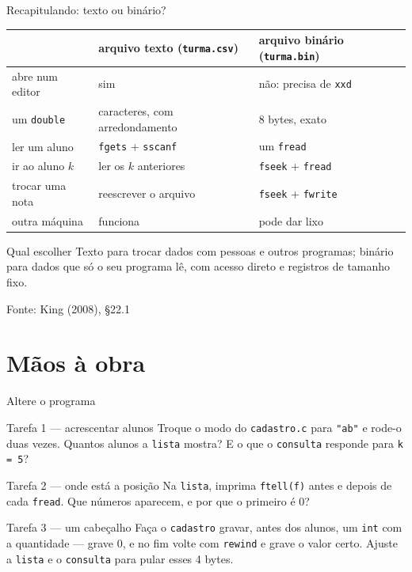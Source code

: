 \documentclass[aspectratio=169]{beamer}
\newcommand{\fonte}[1]{\vfill\hfill{\scriptsize\textcolor{UFSGray}{Fonte: #1}}}
\begin{document}
\begin{frame}{Recapitulando: texto ou binário?}
  \begin{center}
  \footnotesize
  \begin{tabular}{@{}lll@{}}
    \toprule
    & arquivo texto (\texttt{turma.csv}) & arquivo binário (\texttt{turma.bin})\\
    \midrule
    abre num editor          & sim                         & não: precisa de \texttt{xxd}\\
    um \texttt{double}       & caracteres, com arredondamento & 8 bytes, exato\\
    ler um aluno             & \texttt{fgets} + \texttt{sscanf} & um \texttt{fread}\\
    ir ao aluno $k$          & ler os $k$ anteriores       & \texttt{fseek} + \texttt{fread}\\
    trocar uma nota          & reescrever o arquivo        & \texttt{fseek} + \texttt{fwrite}\\
    outra máquina            & funciona                    & pode dar lixo\\
    \bottomrule
  \end{tabular}
  \end{center}
  \begin{block}{Qual escolher}
    \footnotesize Texto para trocar dados com pessoas e outros programas;
    binário para dados que só o seu programa lê, com acesso direto e
    registros de tamanho fixo.
  \end{block}
  \fonte{King (2008), §22.1~\cite{king2008c}}
\end{frame}

\section{Mãos à obra}

\begin{frame}{Altere o programa}
  \begin{block}{Tarefa 1 --- acrescentar alunos}
    \small Troque o modo do \texttt{cadastro.c} para \texttt{"ab"} e rode-o
    duas vezes. Quantos alunos a \texttt{lista} mostra? E o que o
    \texttt{consulta} responde para \texttt{k = 5}?
  \end{block}
  \begin{block}{Tarefa 2 --- onde está a posição}
    \small Na \texttt{lista}, imprima \texttt{ftell(f)} antes e depois de
    cada \texttt{fread}. Que números aparecem, e por que o primeiro é 0?
  \end{block}
  \begin{block}{Tarefa 3 --- um cabeçalho}
    \small Faça o \texttt{cadastro} gravar, antes dos alunos, um
    \texttt{int} com a quantidade --- grave 0, e no fim volte com
    \texttt{rewind} e grave o valor certo. Ajuste a \texttt{lista} e o
    \texttt{consulta} para pular esses 4 bytes.
  \end{block}
\end{frame}
\end{document}
